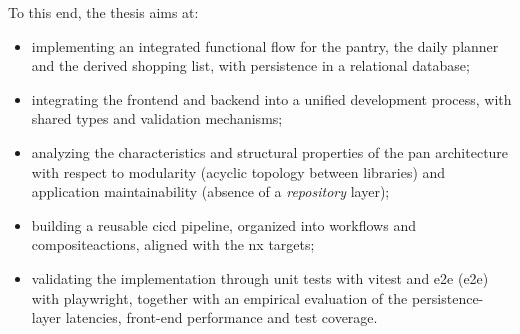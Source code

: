 To this end, the thesis aims at:
\begin{itemize}
  \item implementing an integrated functional flow for the pantry, the daily planner and the derived shopping list, with persistence in a relational database;
  \item integrating the frontend and backend into a unified development process, with shared types and validation mechanisms;
  \item analyzing the characteristics and structural properties of the \gls{pan} architecture with respect to modularity (acyclic topology between libraries) and application maintainability (absence of a \textit{repository} layer);
  \item building a reusable \acrshort{cicd} pipeline, organized into \glspl{workflow} and \glspl{compositeaction}, aligned with the \gls{nx} targets;
  \item validating the implementation through unit tests with \gls{vitest} and \acrlong{e2e} (\acrshort{e2e}) with \gls{playwright}, together with an empirical evaluation of the persistence-layer latencies, front-end performance and test coverage.
\end{itemize}

